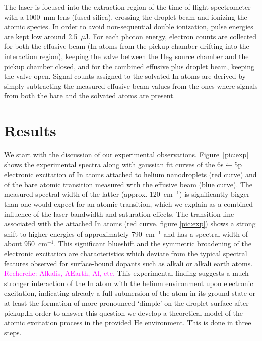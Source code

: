 \documentclass[twoside,twocolumn,9pt]{article}
\def\hl#1{\textcolor{magenta}{#1}}  %
\begin{document}
The laser is focused into the extraction region of the time-of-flight spectrometer with a 1000~mm lens (fused silica), crossing the droplet beam and ionizing the atomic species. In order to avoid non-sequential double ionization, pulse energies are kept low around 2.5~$\mu$J. For each photon energy, electron counts are collected for both the effusive beam (In atoms from the pickup chamber drifting into the interaction region), keeping the valve between the He$_\mathrm{N}$ source chamber and the pickup chamber closed, and for the combined effusive plus droplet beam, keeping the valve open. Signal counts assigned to the solvated In atoms are derived by simply subtracting the measured effusive beam values from the ones where signals from both the bare and the solvated atoms are present. 

\section{Results}
We start with the discussion of our experimental observations. Figure~\ref{pic:exp} shows the experimental spectra along with gaussian fit curves of the 6s$\leftarrow{}$5p electronic excitation of In atoms attached to helium nanodroplets (red curve) and of the bare atomic transition measured with the effusive beam (blue curve). The measured spectral width of the latter (approx. 120~cm$^{-1}$) is significantly bigger than one would expect for an atomic transition, which we explain as a combined influence of the laser bandwidth and saturation effects. The transition line associated with the attached In atoms (red curve, figure \ref{pic:exp}) shows a strong shift to higher energies of approximately 790~cm$^{-1}$ and has a spectral width of about 950~cm$^{-1}$. This significant blueshift and the symmetric broadening of the electronic excitation are characteristics which deviate from the typical spectral features observed for surface-bound dopants such as alkali or alkali earth atoms. \hl{Recherche: Alkalis, AEarth, Al, etc.} This experimental finding suggests a much stronger interaction of the In atom with the helium environment upon electronic excitation, indicating already a full submersion of the atom in its ground state or at least the formation of  more pronounced `dimple' on the droplet surface after pickup.In order to answer this question we develop a theoretical model of the atomic excitation process in the provided He environment. This is done in three steps.
\end{document}
